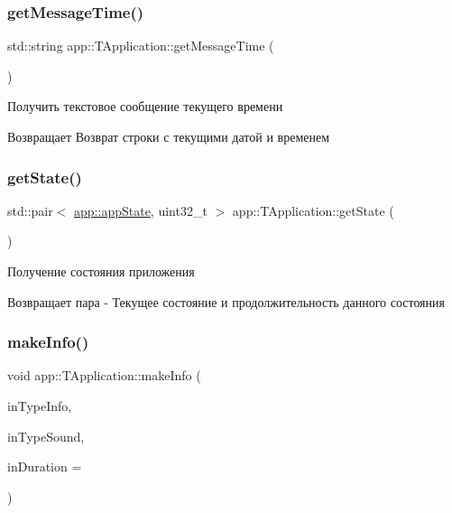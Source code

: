 \subsubsection{\texorpdfstring{get\+Message\+Time()}{getMessageTime()}}
{\footnotesize\ttfamily std\+::string app\+::\+T\+Application\+::get\+Message\+Time (\begin{DoxyParamCaption}{ }\end{DoxyParamCaption})}



Получить текстовое сообщение текущего времени 

\begin{DoxyReturn}{Возвращает}
Возврат строки с текущими датой и временем 
\end{DoxyReturn}
\mbox{\label{classapp_1_1_t_application_a254728135b699d84f82a334708b1fbda}} 
\subsubsection{\texorpdfstring{get\+State()}{getState()}}
{\footnotesize\ttfamily std\+::pair$<$ \hyperlink{namespaceapp_a290e8080c661e52c2f685fd4af148acf}{app\+::app\+State}, uint32\+\_\+t $>$ app\+::\+T\+Application\+::get\+State (\begin{DoxyParamCaption}{ }\end{DoxyParamCaption})}



Получение состояния приложения 

\begin{DoxyReturn}{Возвращает}
пара -\/ Текущее состояние и продолжительность данного состояния 
\end{DoxyReturn}
\mbox{\label{classapp_1_1_t_application_a1d5d4282bfbee6c984b10394f50a6cab}} 
\subsubsection{\texorpdfstring{make\+Info()}{makeInfo()}}
{\footnotesize\ttfamily void app\+::\+T\+Application\+::make\+Info (\begin{DoxyParamCaption}\item[{const \hyperlink{group___xD0_x9F_xD0_xB5_xD1_x80_xD0_xB5_xD1_x87_xD0_xB8_xD1_x81_xD0_xBB_xD0_xB5_xD0_xBD_xD0_xB8_xD1_x8F_gaf2797b8ed91d66a25b1b3b05ea7bcfc2}{app\+::type\+Info}}]{in\+Type\+Info,  }\item[{const \hyperlink{group___xD0_x9F_xD0_xB5_xD1_x80_xD0_xB5_xD1_x87_xD0_xB8_xD1_x81_xD0_xBB_xD0_xB5_xD0_xBD_xD0_xB8_xD1_x8F_ga33d8f1a04a907b6c65c5dfc88280ac6f}{app\+::type\+Sound}}]{in\+Type\+Sound,  }\item[{const uint32\+\_\+t}]{in\+Duration = {} }\end{DoxyParamCaption})}



